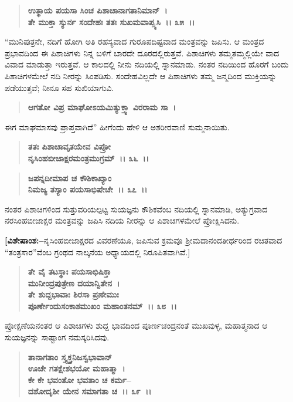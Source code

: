 \begin{verse}
\textbf{ಉತ್ಥಾಯ ಪಯಸಾ ಸಿಂಚ ಪಿಶಾಚಾನಾಗತಾನಿಮಾನ್~।}\\\textbf{ತೇ ಮುಕ್ತಾ ಸ್ಯುರ್ನ ಸಂದೇಹಃ ತತಃ ಸುಖಮವಾಪ್ಸ್ಯಸಿ~।। ೩೫~।।}
\end{verse}

“ಮುನಿಪುತ್ರನೇ, ನದಿಗೆ ಹೋಗಿ ಅತಿ ರಹಸ್ಯವಾದ ಗುರೂಪದಿಷ್ಟವಾದ ಮಂತ್ರವನ್ನು ಜಪಿಸು. ಆ ಮಂತ್ರದ ಪ್ರಭಾವದಿಂದ ಈ ಪಿಶಾಚಿಗಳು ನಿನ್ನ ಬಳಿಗೆ ಬಾರದೇ ದೂರದಲ್ಲಿರುತ್ತವೆ. ಪಿಶಾಚಿಗಳು ತಮ್ಮತಮ್ಮಲ್ಲಿಯೇ ವಾದ ವಿವಾದ ಮಾಡುತ್ತಾ ಇರುತ್ತವೆ. ಆ ಕಾಲದಲ್ಲಿ ನೀನು ನದಿಯಲ್ಲಿ ಸ್ನಾನಮಾಡು. ನಂತರ ನದಿಯಿಂದ ಹೊರಗೆ ಬಂದು ಪಿಶಾಚಿಗಳಮೇಲೆ ನದಿ ನೀರನ್ನು ಸಿಂಪಡಿಸು. ಸಂದೇಹವಿಲ್ಲದೇ ಆ ಪಿಶಾಚಿಗಳು ತಮ್ಮ ಜನ್ಮದಿಂದ ಮುಕ್ತಿಯನ್ನು ಪಡೆಯುತ್ತವೆ; ನೀನೂ ಸಹ ಸುಖಿಯಾಗುವಿ.

\begin{verse}
\textbf{ಆಗತೋ ವಿಪ್ರ ಮಾಘೋಽಯಮಿತ್ಯುಕ್ತ್ವಾ ವಿರರಾಮ ಸಾ~।}
\end{verse}

ಈಗ ಮಾಘಮಾಸವು ಪ್ರಾಪ್ತವಾಗಿದೆ” ಹೀಗೆಂದು ಹೇಳಿ ಆ ಅಶರೀರವಾಣಿ ಸುಮ್ಮನಾಯಿತು.

\begin{verse}
\textbf{ತತಃ ಪಿಶಾಚಾವೃತಯೇವ ವಿಪ್ರೋ}\\\textbf{ನೃಸಿಂಹಬೀಜಾಕ್ಷರಮಂತ್ರಮುಗ್ರಮ್~।। ೩೬~।।} 
\end{verse}

\begin{verse}
\textbf{ಜಪನ್ನದೀಮಾಪ ಚ ಕೌಶಿಕಾಖ್ಯಾಂ}\\\textbf{ನಿಮಜ್ಯ ತಸ್ಯಾಂ ಪಯಸಾಭಿಷೇಚೇ~।। ೩೭~।।}
\end{verse}

ನಂತರ ಪಿಶಾಚಿಗಳಿಂದ ಸುತ್ತುವರಿಯಲ್ಪಟ್ಟ ಸುಯಜ್ಞನು ಕೌಶಿಕವೆಂಬ ನದಿಯಲ್ಲಿ ಸ್ನಾನಮಾಡಿ, ಅತ್ಯುಗ್ರವಾದ ನರಸಿಂಹಬೀಜಾಕ್ಷರ ಮಂತ್ರವನ್ನು ಜಪಿಸಿ ನದಿಯ ನೀರನ್ನು ಆ ಪಿಶಾಚಿಗಳಮೇಲೆ ಪ್ರೋಕ್ಷಿಸಿದನು.

\textbf{[ವಿಶೇಷಾಂಶ:–}ನೃಸಿಂಹಬೀಜಾಕ್ಷರದ ವಿವರಣೆಯೂ, ಜಪಿಸುವ ಕ್ರಮವೂ ಶ‍್ರೀಮದಾನಂದ\-ತೀರ್ಥರಿಂದ ರಚಿತವಾದ “ತಂತ್ರಸಾರ”ವೆಂಬ ಗ್ರಂಥದ ನಾಲ್ಕನೆಯ ಅಧ್ಯಾಯದಲ್ಲಿ ನಿರೂಪಿತವಾಗಿವೆ.]

\begin{verse}
\textbf{ತೇ ವೈ ತಟಸ್ಥಾಃ ಪಯಸಾಭಿಷಿಕ್ತಾ} \\\textbf{ಮುನೀಂದ್ರಪುತ್ರೇಣ ದಯಾನ್ವಿತೇನ~।}\\\textbf{ತೇ ಶುದ್ದಭಾವಾಃ ಶಿರಸಾ ಪ್ರಣೇಮುಃ} \\\textbf{ಪೂರ್ಣೇಂದುಸಂಕಾಶಮುಖಂ ಮಹಾಂತನಮ್~।। ೩೮~।।}
\end{verse}

ಪ್ರೋಕ್ಷಣೆಯನಂತರ ಆ ಪಿಶಾಚಿಗಳು ಶುದ್ದ ಭಾವದಿಂದ ಪೂರ್ಣಚಂದ್ರನಂತೆ ಮುಖವುಳ್ಳ, ಮಹಾತ್ಮನಾದ ಆ ಸುಯಜ್ಞನನ್ನು ಸಾಷ್ಟಾಂಗ ನಮಸ್ಕರಿಸಿದವು.

\begin{verse}
\textbf{ತಾನಾಗತಾಂ ಸ್ತ್ಯ್ತಕ್ತನಿಜಸ್ವಭಾವಾನ್} \\\textbf{ಊಚೇ ಗತಕ್ಷೇಶಭಯೋ ಮಹಾತ್ಮಾ~।}\\\textbf{ಕೇ ಕೇ ಭವಂತೋ ಭವತಾಂ ಚ ಕರ್ಮ–} \\\textbf{ದಶೋದೃಶೀ ಯೇನ ಸಮಾಗತಾ ಚ~।। ೩೯~।। }
\end{verse}

